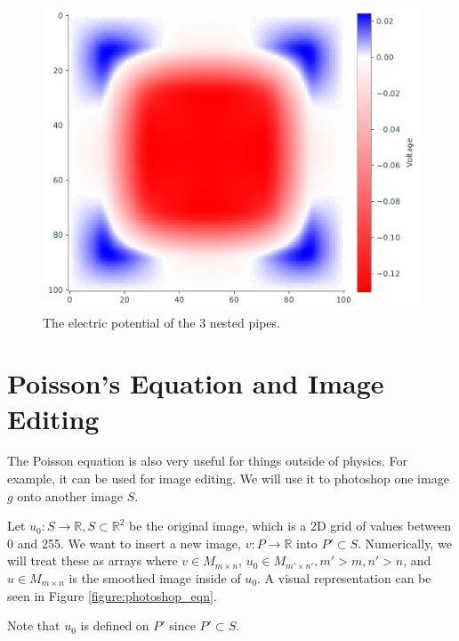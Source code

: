 \begin{figure}
\includegraphics[scale=0.7]{figures/potential.pdf}
\caption{The electric potential of the 3 nested pipes.}
\end{figure}

\section*{Poisson's Equation and Image Editing}
The Poisson equation is also very useful for things outside of physics. For example, it can be used for image editing. We will use it to photoshop one image $g$ onto another image $S$.

Let $u_0:  S \rightarrow \mathbb{R}, S \subset \mathbb{R}^2$ be the original image, which is a 2D grid of values between 0 and 255. We want to insert a new image, $v: P\rightarrow \mathbb{R}$ into $P' \subset S$. Numerically, we will treat these as arrays where $v\in M_{m\times n}$, $u_0\in M_{m'\times n'}, m'>m, n'>n$, and $u \in M_{m\times n}$ is the smoothed image inside of $u_0$. A visual representation can be seen in Figure \ref{figure:photoshop_eqn}.

\begin{warn}
Note that $u_0$ is defined on $P'$ since $P' \subset S$.
\end{warn}


